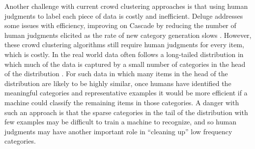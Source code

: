 Another challenge with current crowd clustering approaches is that using human judgments to label each piece of data is costly and inefficient. Deluge addresses some issues with efficiency, improving on Cascade by reducing the number of human judgments elicited as the rate of new category generation slows \cite{chilton2013cascade}. However, these crowd clustering algorithms still require human judgments for every item, which is costly. In the real world data often follows a long-tailed distribution in which much of the data is captured by a small number of categories in the head of the distribution \cite{white2007studying}. For such data in which many items in the head of the distribution are likely to be highly similar, once humans have identified the meaningful categories and representative examples it would be more efficient if a machine could classify the remaining items in those categories. A danger with such an approach is that the sparse categories in the tail of the distribution with few examples may be difficult to train a machine to recognize, and so human judgments may have another important role in ``cleaning up'' low frequency categories.



